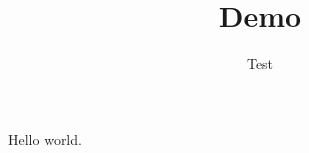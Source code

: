 \documentclass[12pt]{article}
\author{Test}
\title{Demo}
\begin{document}
\maketitle
Hello world.
\end{document}
